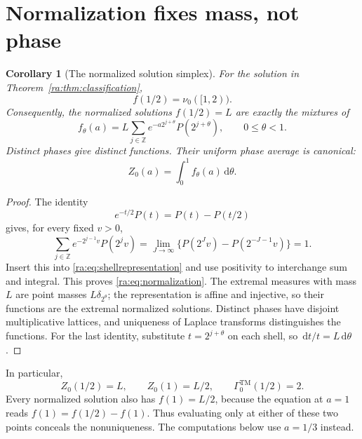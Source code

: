 \documentclass[11pt,a4paper,oneside,openany]{book}
\numberwithin{equation}{chapter}
\newtheorem{corollary}[theorem]{Corollary}
\theoremstyle{definition}
\theoremstyle{remark}
\newcommand{\Z}{\mathbb Z}
\newcommand{\dd}{\,\mathrm d}
\begin{document}
\section{Normalization fixes mass, not phase}
\begin{corollary}[The normalized solution simplex]\label{ra:cor:normalization}
For the solution in Theorem~\ref{ra:thm:classification},
\begin{equation}\label{ra:eq:normalization}
 f(1/2)=\nu_0([1,2)).
\end{equation}
Consequently, the normalized solutions $f(1/2)=L$ are exactly the
mixtures of
\begin{equation}\label{ra:eq:phasefunctions}
 f_\theta(a)=L\sum_{j\in\Z}
      e^{-a2^{j+\theta}}P(2^{j+\theta}),\qquad 0\le\theta<1.
\end{equation}
Distinct phases give distinct functions. Their uniform phase average is
canonical:
\begin{equation}\label{ra:eq:canonicalaverage}
 Z_0(a)=\int_0^1 f_\theta(a)\dd\theta.
\end{equation}
\end{corollary}
\begin{proof}
The identity
\begin{equation}\label{ra:eq:telescoper}
 e^{-t/2}P(t)=P(t)-P(t/2)
\end{equation}
gives, for every fixed $v>0$,
\[
 \sum_{j\in\Z}e^{-2^{j-1}v}P(2^jv)
 =\lim_{J\to\infty}\{P(2^Jv)-P(2^{-J-1}v)\}=1.
\]
Insert this into \eqref{ra:eq:shellrepresentation} and use positivity to
interchange sum and integral. This proves \eqref{ra:eq:normalization}.
The extremal measures with mass $L$ are point masses
$L\delta_{2^\theta}$; the representation is affine and injective,
so their functions are the extremal normalized solutions.
Distinct phases have disjoint multiplicative lattices, and uniqueness of
Laplace transforms distinguishes the functions.
For the last identity, substitute $t=2^{j+\theta}$ on each shell, so
$\dd t/t=L\dd\theta$.
\end{proof}

In particular,
\begin{equation}\label{ra:eq:canonicalnorms}
 Z_0(1/2)=L,\qquad Z_0(1)=L/2,
 \qquad\Gamma_0^{\mathrm{TM}}(1/2)=2.
\end{equation}
Every normalized solution also has $f(1)=L/2$, because the equation
at $a=1$ reads $f(1)=f(1/2)-f(1)$.
Thus evaluating only at either of these two points conceals the
nonuniqueness. The computations below use $a=1/3$ instead.
\end{document}

